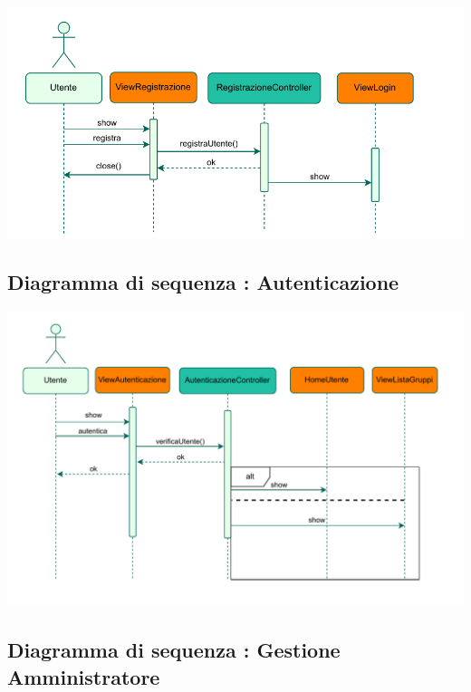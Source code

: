 \begin{adjustwidth}{-0.5cm}{0cm}
\includegraphics[scale=0.9]{interazione/Package-Interazione-Registrazione.drawio.pdf}
\end{adjustwidth}

\subsection*{Diagramma di sequenza : Autenticazione}
\vspace{0.5cm}

\begin{adjustwidth}{-0.5cm}{0cm}
\includegraphics[scale=0.9]{interazione/Package-Interazione-Autenticazione.drawio.pdf}
\end{adjustwidth}


\subsection*{Diagramma di sequenza : Gestione Amministratore}
\vspace{0.5cm}

